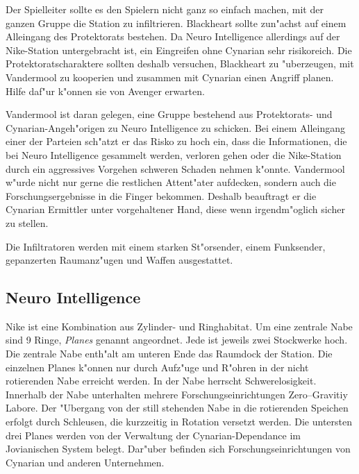 \begin{remarks}
	Der Spielleiter sollte es den Spielern nicht ganz so einfach machen, mit der ganzen Gruppe die Station zu infiltrieren. Blackheart sollte zun"achst auf einem Alleingang des Protektorats bestehen. Da Neuro Intelligence allerdings auf der Nike-Station untergebracht ist, ein Eingreifen ohne Cynarian sehr risikoreich. Die Protektoratscharaktere sollten deshalb versuchen, Blackheart zu "uberzeugen, mit Vandermool zu kooperien und zusammen mit Cynarian einen Angriff planen. Hilfe daf"ur k"onnen sie von Avenger erwarten.
	
	Vandermool ist daran gelegen, eine Gruppe bestehend aus Protektorats- und Cynarian-Angeh"origen zu Neuro Intelligence zu schicken. Bei einem Alleingang einer der Parteien sch"atzt er das Risko zu hoch ein, dass die Informationen, die bei Neuro Intelligence gesammelt werden, verloren gehen oder die Nike-Station durch ein aggressives Vorgehen schweren Schaden nehmen k"onnte. Vandermool w"urde nicht nur gerne die restlichen Attent"ater aufdecken, sondern auch die Forschungsergebnisse in die Finger bekommen. Deshalb beauftragt er die Cynarian Ermittler unter vorgehaltener Hand, diese wenn irgendm"oglich sicher zu stellen.
	
	Die Infiltratoren werden mit einem starken St"orsender, einem Funksender, gepanzerten Raumanz"ugen und Waffen ausgestattet.
\end{remarks}

\subsection{Neuro Intelligence}

Nike ist eine Kombination aus Zylinder- und Ringhabitat. Um eine zentrale Nabe sind 9 Ringe, \emph{Planes} genannt angeordnet. Jede ist jeweils zwei Stockwerke hoch. Die zentrale Nabe enth"alt am unteren Ende das Raumdock der Station.  Die einzelnen Planes k"onnen nur durch Aufz"uge und R"ohren in der nicht rotierenden Nabe erreicht werden. In der Nabe herrscht Schwerelosigkeit. Innerhalb der Nabe unterhalten mehrere Forschungseinrichtungen Zero--Gravitiy Labore. Der "Ubergang von der still stehenden Nabe in die rotierenden Speichen erfolgt durch Schleusen, die kurzzeitig in Rotation versetzt werden. Die untersten drei Planes werden von der Verwaltung der Cynarian-Dependance im Jovianischen System belegt. Dar"uber befinden sich Forschungseinrichtungen von Cynarian und anderen Unternehmen.

